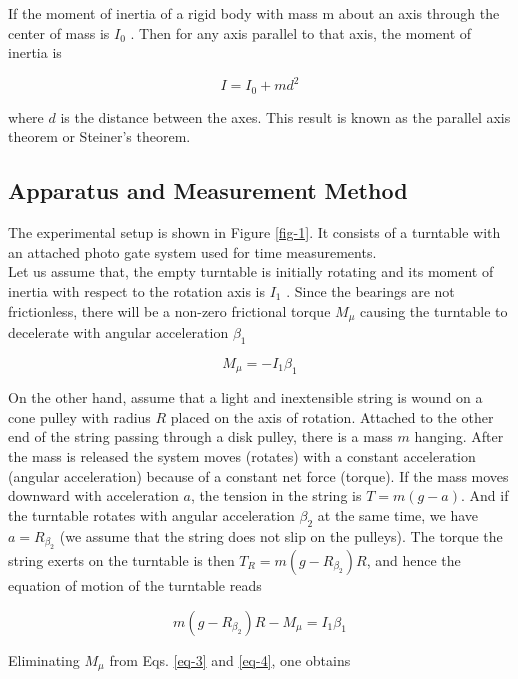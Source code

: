 \documentclass{article}
\begin{document}
If the moment of inertia of a rigid body with mass m about an axis through the center
of mass is $I_0$ . Then for any axis parallel to that axis, the moment of inertia is

\begin{equation}\label{eq-2}
I=I_0+md^2
\end{equation}

where $d$ is the distance between the axes. This result is known as the parallel axis theorem
or Steiner’s theorem.

\subsection{Apparatus and Measurement Method}

The experimental setup is shown in Figure \ref{fig-1}. It consists of a turntable with an
attached photo gate system used for time measurements.\\

Let us assume that, the empty turntable is initially rotating and its moment of inertia
with respect to the rotation axis is $I_1$ . Since the bearings are not frictionless, there
will be a non-zero frictional torque $M_\mu$ causing the turntable to decelerate with angular
acceleration $\beta_1$

\begin{equation}\label{eq-3}
M_\mu=-I_1\beta_1
\end{equation}

On the other hand, assume that a light and inextensible string is wound on a cone
pulley with radius $R$ placed on the axis of rotation. Attached to the other end of the string
passing through a disk pulley, there is a mass $m$ hanging. After the mass is released the
system moves (rotates) with a constant acceleration (angular acceleration) because of a
constant net force (torque). If the mass moves downward with acceleration $a$, the tension
in the string is $T = m(g − a)$. And if the turntable rotates with angular acceleration $\beta_2$ at
the same time, we have $a = R_{\beta_2}$ (we assume that the string does not slip on the pulleys).
The torque the string exerts on the turntable is then $T_R = m(g − R_{\beta_2} )R$, and hence the
equation of motion of the turntable reads

\begin{equation}\label{eq-4}
m(g − R_{\beta_2} )R-M_\mu=I_1\beta_1
\end{equation}

Eliminating $M_\mu$ from Eqs. \ref{eq-3} and \ref{eq-4}, one obtains
\end{document}
